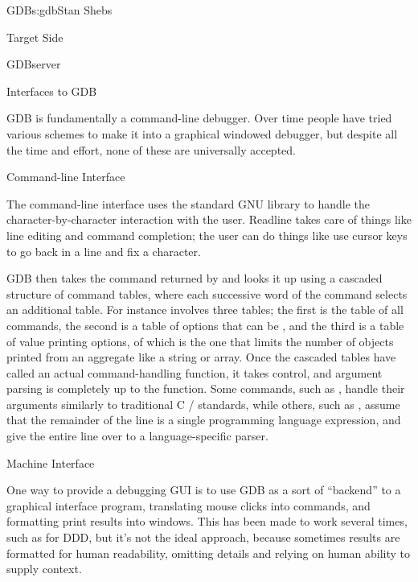 \begin{aosachapter}{GDB}{s:gdb}{Stan Shebs}
\begin{aosasect1}{Target Side}
\begin{aosasect2}{GDBserver}
\end{aosasect2}

\end{aosasect1}

\begin{aosasect1}{Interfaces to GDB}

GDB is fundamentally a command-line debugger.  Over time people have
tried various schemes to make it into a graphical windowed debugger,
but despite all the time and effort, none of these are universally
accepted.

\begin{aosasect2}{Command-line Interface}

The command-line interface uses the standard GNU library
 to handle the character-by-character interaction with
the user.  Readline takes care of things like line editing and command
completion; the user can do things like use cursor keys to go back in
a line and fix a character.

GDB then takes the command returned by  and looks it up
using a cascaded structure of command tables, where each successive
word of the command selects an additional table.  For instance
 involves three tables; the first is the
table of all commands, the second is a table of options that can be
, and the third is a table of value printing options, of
which  is the one that limits the number of objects
printed from an aggregate like a string or array.  Once the cascaded
tables have called an actual command-handling function, it takes
control, and argument parsing is completely up to the function.  Some
commands, such as , handle their arguments similarly to
traditional C / standards, while others, such as
, assume that the remainder of the line is a single
programming language expression, and give the entire line over to a
language-specific parser.

\end{aosasect2}

\begin{aosasect2}{Machine Interface}

One way to provide a debugging GUI is to use GDB as a sort of
``backend'' to a graphical interface program, translating mouse clicks
into commands, and formatting print results into windows.  This has
been made to work several times, such as for DDD, but it's not the
ideal approach, because sometimes results are formatted for human
readability, omitting details and relying on human ability to supply
context.


\end{aosasect2}
\end{aosasect1}
\end{aosachapter}
